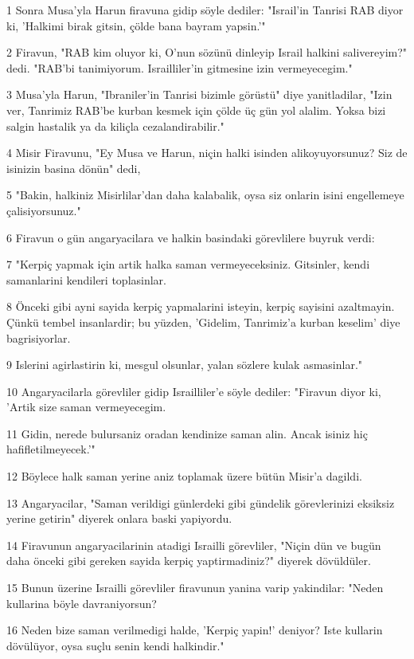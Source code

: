 \par 1 Sonra Musa'yla Harun firavuna gidip söyle dediler: "Israil'in Tanrisi RAB diyor ki, 'Halkimi birak gitsin, çölde bana bayram yapsin.'"
\par 2 Firavun, "RAB kim oluyor ki, O'nun sözünü dinleyip Israil halkini salivereyim?" dedi. "RAB'bi tanimiyorum. Israilliler'in gitmesine izin vermeyecegim."
\par 3 Musa'yla Harun, "Ibraniler'in Tanrisi bizimle görüstü" diye yanitladilar, "Izin ver, Tanrimiz RAB'be kurban kesmek için çölde üç gün yol alalim. Yoksa bizi salgin hastalik ya da kiliçla cezalandirabilir."
\par 4 Misir Firavunu, "Ey Musa ve Harun, niçin halki isinden alikoyuyorsunuz? Siz de isinizin basina dönün" dedi,
\par 5 "Bakin, halkiniz Misirlilar'dan daha kalabalik, oysa siz onlarin isini engellemeye çalisiyorsunuz."
\par 6 Firavun o gün angaryacilara ve halkin basindaki görevlilere buyruk verdi:
\par 7 "Kerpiç yapmak için artik halka saman vermeyeceksiniz. Gitsinler, kendi samanlarini kendileri toplasinlar.
\par 8 Önceki gibi ayni sayida kerpiç yapmalarini isteyin, kerpiç sayisini azaltmayin. Çünkü tembel insanlardir; bu yüzden, 'Gidelim, Tanrimiz'a kurban keselim' diye bagrisiyorlar.
\par 9 Islerini agirlastirin ki, mesgul olsunlar, yalan sözlere kulak asmasinlar."
\par 10 Angaryacilarla görevliler gidip Israilliler'e söyle dediler: "Firavun diyor ki, 'Artik size saman vermeyecegim.
\par 11 Gidin, nerede bulursaniz oradan kendinize saman alin. Ancak isiniz hiç hafifletilmeyecek.'"
\par 12 Böylece halk saman yerine aniz toplamak üzere bütün Misir'a dagildi.
\par 13 Angaryacilar, "Saman verildigi günlerdeki gibi gündelik görevlerinizi eksiksiz yerine getirin" diyerek onlara baski yapiyordu.
\par 14 Firavunun angaryacilarinin atadigi Israilli görevliler, "Niçin dün ve bugün daha önceki gibi gereken sayida kerpiç yaptirmadiniz?" diyerek dövüldüler.
\par 15 Bunun üzerine Israilli görevliler firavunun yanina varip yakindilar: "Neden kullarina böyle davraniyorsun?
\par 16 Neden bize saman verilmedigi halde, 'Kerpiç yapin!' deniyor? Iste kullarin dövülüyor, oysa suçlu senin kendi halkindir."
